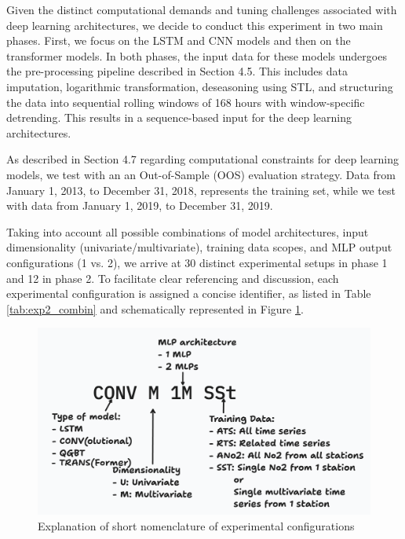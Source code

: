 \documentclass[12pt,a4paper]{book}
\begin{document}
Given the distinct computational demands and tuning challenges associated with deep learning architectures, we decide to conduct this experiment in two main phases. First, we focus on the LSTM and CNN models and then on the transformer models. In both phases, the input data for these models undergoes the pre-processing pipeline described in Section 4.5. This includes data imputation, logarithmic transformation, deseasoning using STL, and structuring the data into sequential rolling windows of 168 hours with window-specific detrending. This results in a sequence-based input for the deep learning architectures. 

As described in Section 4.7 regarding computational constraints for deep learning models, we test with an an Out-of-Sample (OOS) evaluation strategy. Data from January 1, 2013, to December 31, 2018, represents the training set, while we test with data from January 1, 2019, to December 31, 2019. 

Taking into account all possible combinations of model architectures, input dimensionality (univariate/multivariate), training data scopes, and MLP output configurations (1 vs. 2), we arrive at 30 distinct experimental setups in phase 1 and 12 in phase 2. To facilitate clear referencing and discussion, each experimental configuration is assigned a concise identifier, as listed in Table \ref{tab:exp2_combin} and schematically represented in Figure \ref{fig:exp2_nom}.

\begin{figure}[h] 
  \centering  
  \includegraphics[width=.7\textwidth]{nom.png}
  \caption{Explanation of short nomenclature of experimental configurations }
  \label{fig:exp2_nom}
\end{figure}
\end{document}

